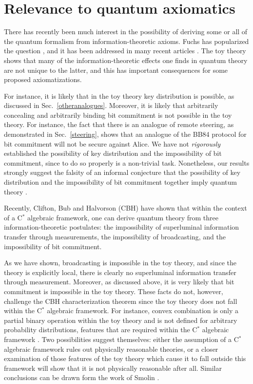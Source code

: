 \documentclass[pra,twocolumn,nofootinbib,showpacs]{revtex4}
\begin{document}
\section{Relevance to quantum axiomatics}

\label{relevancetoaxiomatics}

There has recently been much interest in the possibility of deriving some or
all of the quantum formalism from information-theoretic axioms. Fuchs has
popularized the question \cite{Fuchs}, and it has been addressed in many
recent articles \cite{Fuchs,Halvorson,CBH,Smolin,HalvorsonBub}. The toy
theory shows that many of the information-theoretic effects one finds in
quantum theory are not unique to the latter, and this has important
consequences for some proposed axiomatizations.

For instance, it is likely that in the toy theory key distribution \cite%
{BB84} is possible, as discussed in Sec.~\ref{otheranalogues}. Moreover, it
is likely that arbitrarily concealing and arbitrarily binding bit commitment
\cite{bitcommitment,SpekkensRudolphPRA} is not possible in the toy theory.
For instance, the fact that there is an analogue of remote steering, as
demonstrated in Sec.~\ref{steering}, shows that an analogue of the BB84
protocol for bit commitment \cite{BB84} will not be secure against Alice. We
have not \emph{rigorously} established the possibility of key distribution
and the impossibility of bit commitment, since to do so properly is a
non-trivial task. Nonetheless, our results strongly suggest the falsity of
an informal conjecture that the possibility of key distribution and the
impossibility of bit commitment together imply quantum theory \cite%
{FuchsBrassard}.

Recently, Clifton, Bub and Halvorson (CBH) \cite{CBH} have shown that within
the context of a C$^{*}$ algebraic framework, one can derive quantum theory
from three information-theoretic postulates: the impossibility of
superluminal information transfer through measurements, the impossibility of
broadcasting, and the impossibility of bit commitment.

As we have shown, broadcasting is impossible in the toy theory, and since
the theory is explicitly local, there is clearly no superluminal information
transfer through measurement. Moreover, as discussed above, it is very
likely that bit commitment is impossible in the toy theory. These facts do
not, however, challenge the CBH characterization theorem since the toy
theory does not fall within the C$^{*}$ algebraic framework. For instance,
convex combination is only a partial binary operation within the toy theory
and is not defined for arbitrary probability distributions, features that
are required within the C$^{*}$ algebraic framework \cite{Halvorson}. Two
possibilities suggest themselves: either the assumption of a C$^{*}$
algebraic framework rules out physically reasonable theories, or a closer
examination of those features of the toy theory which cause it to fall
outside this framework will show that it is not physically reasonable after
all. Similar conclusions can be drawn form the work of Smolin \cite{Smolin}.
\end{document}
